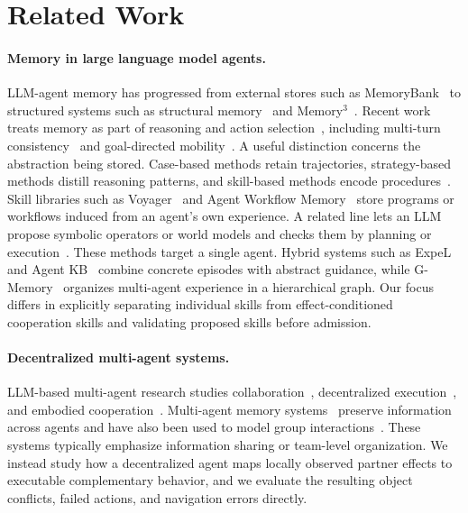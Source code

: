 \documentclass{article}
\theoremstyle{plain}
\theoremstyle{definition}
\theoremstyle{remark}
\begin{document}
 
 
\section{Related Work}
 
\paragraph{Memory in large language model agents.}
LLM-agent memory has progressed from external stores such as MemoryBank~\citep{Zhong2023MemoryBankELA} to structured systems such as structural memory~\citep{zeng2024structural} and Memory$^3$~\citep{Yang2024Memory3LMA}. Recent work treats memory as part of reasoning and action selection~\citep{xu2025mem,zhang2024agentic}, including multi-turn consistency~\citep{hu2025evaluating} and goal-directed mobility~\citep{feng2024agentmove}. A useful distinction concerns the abstraction being stored. Case-based methods retain trajectories, strategy-based methods distill reasoning patterns, and skill-based methods encode procedures~\citep{zhang2024survey}. Skill libraries such as Voyager~\citep{wang2023voyager} and Agent Workflow Memory~\citep{wang2024agent} store programs or workflows induced from an agent's own experience. A related line lets an LLM propose symbolic operators or world models and checks them by planning or execution~\citep{wong2024learning,guan2023leveraging}. These methods target a single agent. Hybrid systems such as ExpeL~\citep{zhao2024expel} and Agent KB~\citep{tang2025agent} combine concrete episodes with abstract guidance, while G-Memory~\citep{zhang2025g} organizes multi-agent experience in a hierarchical graph. Our focus differs in explicitly separating individual skills from effect-conditioned cooperation skills and validating proposed skills before admission.
 
 
\paragraph{Decentralized multi-agent systems.}
LLM-based multi-agent research studies collaboration~\citep{guo2024large,tran2025multi}, decentralized execution~\citep{chen2024scalable,yang2025agentnet}, and embodied cooperation~\citep{zhang2023building}. Multi-agent memory systems~\citep{wang2025mirix,zhang2025g} preserve information across agents and have also been used to model group interactions~\citep{haase2025beyond}. These systems typically emphasize information sharing or team-level organization. We instead study how a decentralized agent maps locally observed partner effects to executable complementary behavior, and we evaluate the resulting object conflicts, failed actions, and navigation errors directly.
\end{document}
